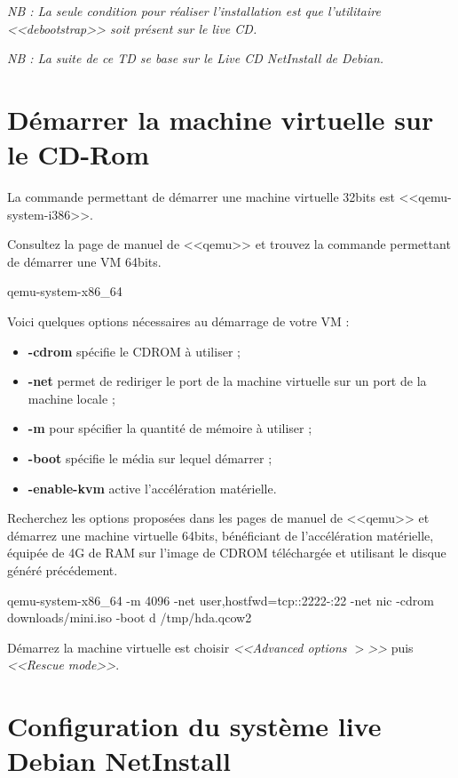 \documentclass[11pt]{article}
\begin{document}
\emph{NB : La seule condition pour réaliser l'installation est que l'utilitaire
<<debootstrap>> soit présent sur le live CD.}

\emph{NB : La suite de ce TD se base sur le Live CD NetInstall de Debian.}

\section{Démarrer la machine virtuelle sur le CD-Rom}

La commande permettant de démarrer une machine virtuelle 32bits est
<<qemu-system-i386>>.

Consultez la page de manuel de <<qemu>> et trouvez la commande permettant de
démarrer une VM 64bits.

\begin{solution}
qemu-system-x86\_64
\end{solution}

Voici quelques options nécessaires au démarrage de votre VM :

\begin{itemize}
 \item \textbf{-cdrom} spécifie le CDROM à utiliser ;
 \item \textbf{-net} permet de rediriger le port de la machine virtuelle sur
un port de la machine locale ;
 \item \textbf{-m} pour spécifier la quantité de mémoire à utiliser ;
 \item \textbf{-boot} spécifie le média sur lequel démarrer ;
 \item \textbf{-enable-kvm} active l'accélération matérielle.
\end{itemize}

Recherchez les options proposées dans les pages de manuel de <<qemu>> et
démarrez une machine virtuelle 64bits, bénéficiant de l'accélération matérielle,
équipée de 4G de RAM sur l'image de CDROM téléchargée et utilisant le disque
généré précédement.

\begin{solution}
qemu-system-x86\_64 -m 4096 -net user,hostfwd=tcp::2222-:22 -net nic -cdrom downloads/mini.iso -boot
d /tmp/hda.qcow2
\end{solution}

Démarrez la machine virtuelle est choisir \emph{<<Advanced options $>$>>} puis
\emph{<<Rescue mode>>}.

\section{Configuration du système live Debian NetInstall}
\end{document}
